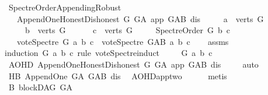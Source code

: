 \begin{isabellebody}
\isanewline
\isanewline
{}\isamarkupfalse%
\ Spectre{\isacharunderscore}{\kern0pt}Order{\isacharunderscore}{\kern0pt}Appending{\isacharunderscore}{\kern0pt}Robust{\isacharcolon}{\kern0pt}\isanewline
\ \ \ {\isachardoublequoteopen}Append{\isacharunderscore}{\kern0pt}One{\isacharunderscore}{\kern0pt}Honest{\isacharunderscore}{\kern0pt}Dishonest\ G\ G{\isacharunderscore}{\kern0pt}A\ app\ G{\isacharunderscore}{\kern0pt}AB\ dis{\isachardoublequoteclose}\isanewline
\ \ \ \ \ {\isachardoublequoteopen}a\ {\isasymin}\ verts\ G{\isachardoublequoteclose}\isanewline
\ \ \ \ \ {\isachardoublequoteopen}b\ {\isasymin}\ verts\ G{\isachardoublequoteclose}\ \isanewline
\ \ \ \ \ {\isachardoublequoteopen}c\ {\isasymin}\ verts\ G{\isachardoublequoteclose}\isanewline
\ \ \ \ \ {\isachardoublequoteopen}Spectre{\isacharunderscore}{\kern0pt}Order\ G\ b\ c{\isachardoublequoteclose}\isanewline
\ \ \ {\isachardoublequoteopen}vote{\isacharunderscore}{\kern0pt}Spectre\ G\ a\ b\ c\ {\isasymle}\ vote{\isacharunderscore}{\kern0pt}Spectre\ G{\isacharunderscore}{\kern0pt}AB\ a\ b\ c{\isachardoublequoteclose}\isanewline
%
\isadelimproof
\ \ %
\endisadelimproof
%
\isatagproof
{}\isamarkupfalse%
\ assms\isanewline
{}\isamarkupfalse%
{\isacharparenleft}{\kern0pt}induction\ G\ a\ b\ c\ rule{\isacharcolon}{\kern0pt}\ vote{\isacharunderscore}{\kern0pt}Spectre{\isachardot}{\kern0pt}induct{\isacharparenright}{\kern0pt}\isanewline
\ \ \isamarkupfalse%
\ {\isacharparenleft}{\kern0pt}{}\ G\ a\ b\ c{\isacharparenright}{\kern0pt}\isanewline
\ \ \isamarkupfalse%
\ AOHD{\isacharcolon}{\kern0pt}\ Append{\isacharunderscore}{\kern0pt}One{\isacharunderscore}{\kern0pt}Honest{\isacharunderscore}{\kern0pt}Dishonest\ G\ G{\isacharunderscore}{\kern0pt}A\ app\ G{\isacharunderscore}{\kern0pt}AB\ dis\ \isamarkupfalse%
\ {}\ \isamarkupfalse%
\ auto\isanewline
\ \ \isamarkupfalse%
\ HB{}{\isacharcolon}{\kern0pt}\ Append{\isacharunderscore}{\kern0pt}One\ G{\isacharunderscore}{\kern0pt}A\ G{\isacharunderscore}{\kern0pt}AB\ dis\ \isamarkupfalse%
\ AOHD{\isachardot}{\kern0pt}app{\isacharunderscore}{\kern0pt}two\isanewline
\ \ \ \ \isamarkupfalse%
\ metis\isanewline
\ \ \isamarkupfalse%
\ B{}{\isacharcolon}{\kern0pt}\ blockDAG\ {\isachardoublequoteopen}G{\isacharunderscore}{\kern0pt}A{\isachardoublequoteclose}\ \isamarkupfalse%

\end{isabellebody}
